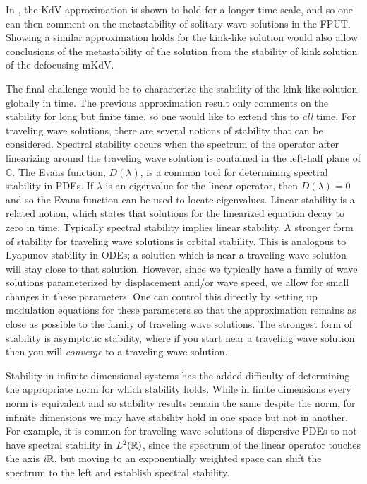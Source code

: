 In \cite{khan2017long}, the KdV approximation is shown to hold for a longer time scale, and so one can then comment on the metastability of solitary wave solutions in the FPUT. Showing a similar approximation holds for the kink-like solution would also allow conclusions of the metastability of the solution from the stability of kink solution of the defocusing mKdV.

The final challenge would be to characterize the stability of the kink-like solution globally in time. The previous approximation result only comments on the stability for long but finite time, so one would like to extend this to \emph{all} time. For traveling wave solutions, there are several notions of stability that can be considered. Spectral stability occurs when the spectrum of the operator after linearizing around the traveling wave solution is contained in the left-half plane of \(\mathbb C\). The Evans function, \(D(\lambda)\), is a common tool for determining spectral stability in PDEs. If \(\lambda\) is an eigenvalue for the linear operator, then \(D(\lambda) = 0\) and so the Evans function can be used to locate eigenvalues. Linear stability is a related notion, which states that solutions for the linearized equation decay to zero in time. Typically spectral stability implies linear stability. A stronger form of stability for traveling wave solutions is orbital stability. This is analogous to Lyapunov stability in ODEs; a solution which is near a traveling wave solution will stay close to that solution. However, since we typically have a family of wave solutions parameterized by displacement and/or wave speed, we allow for small changes in these parameters. One can control this directly by setting up modulation equations for these parameters so that the approximation remains as close as possible to the family of traveling wave solutions. The strongest form of stability is asymptotic stability, where if you start near a traveling wave solution then you will \emph{converge} to a traveling wave solution.

Stability in infinite-dimensional systems has the added difficulty of determining the appropriate norm for which stability holds. While in finite dimensions every norm is equivalent and so stability results remain the same despite the norm, for infinite dimensions we may have stability hold in one space but not in another.  For example, it is common for traveling wave solutions of dispersive PDEs to not have spectral stability in \(L^2(\mathbb{R})\), since the spectrum of the linear operator touches the axis \(i \mathbb{R}\), but moving to an exponentially weighted space can shift the spectrum to the left and establish spectral stability.

